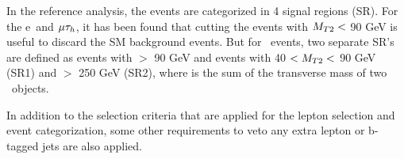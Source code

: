In the reference analysis, the events are categorized in 4 signal regions (SR). For the e\Tau ~and $\mu\tau_h$, it has been found that cutting the events with $M_{T2} <$ 90 GeV is useful to discard the SM background events. But for \tauTau ~events, two separate SR's are defined as events with \mttwo $>$ 90 GeV and events with 40 $<M_{T2}<$ 90 GeV (SR1) and \SumMT $>$ 250 GeV (SR2), where \SumMT is the sum of the transverse mass of two \Tau ~objects.

In addition to the selection criteria that are applied for the lepton selection and event categorization, some other requirements to veto any extra lepton or b-tagged jets  are also applied. 

